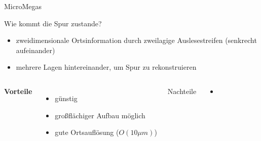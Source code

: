 \begin{frame}{MicroMegas}

	\begin{block}{Wie kommt die Spur zustande?}
		\begin{itemize}
		  \item zweidimensionale Ortsinformation durch zweilagige Auslesestreifen (senkrecht aufeinander)
		  \item mehrere Lagen hintereinander, um Spur zu rekonstruieren
		\end{itemize}
	\end{block}
	\vspace{0.8cm}
    \begin{columns}[T]
			\bf{Vorteile}		
			\begin{itemize}
			  \item günstig
			  \item großflächiger Aufbau möglich
			  \item gute Ortsauflösung ($O(10\mu m)$)
			\end{itemize}	
	    	Nachteile
	    	\begin{itemize}
			  \item 
			\end{itemize}
    \end{columns}
    \vspace{1cm}
\end{frame}